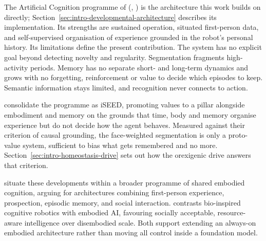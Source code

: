 The Artificial Cognition programme of \citeauthor{Pasquali2024ArtificialCognition} (\citeyear{Pasquali2024ArtificialCognition}, \citeyear{Pasquali2025AlwaysOn}) is the architecture this work builds on directly; Section~\ref{sec:intro-developmental-architecture} describes its implementation. Its strengths are sustained operation, situated first-person data, and self-supervised organisation of experience grounded in the robot's personal history. Its limitations define the present contribution. The system has no explicit goal beyond detecting novelty and regularity. Segmentation fragments high-activity periods. Memory has no separate short- and long-term dynamics and grows with no forgetting, reinforcement or value to decide which episodes to keep. Semantic information stays limited, and recognition never connects to action.

\citet{Pasquali2026ISEED} consolidate the programme as iSEED, promoting values to a pillar alongside embodiment and memory on the grounds that time, body and memory organise experience but do not decide how the agent behaves. Measured against their criterion of causal grounding, the face-weighted segmentation is only a proto-value system, sufficient to bias what gets remembered and no more. Section~\ref{sec:intro-homeostasis-drive} sets out how the orexigenic drive answers that criterion.

\citet{Sandini2025MutualUnderstanding} situate these developments within a broader programme of shared embodied cognition, arguing for architectures combining first-person experience, prospection, episodic memory, and social interaction. \citet{Morasso2026BioInspiredCognitive} contrasts bio-inspired cognitive robotics with embodied AI, favouring socially acceptable, resource-aware intelligence over disembodied scale. Both support extending an always-on embodied architecture rather than moving all control inside a foundation model.
